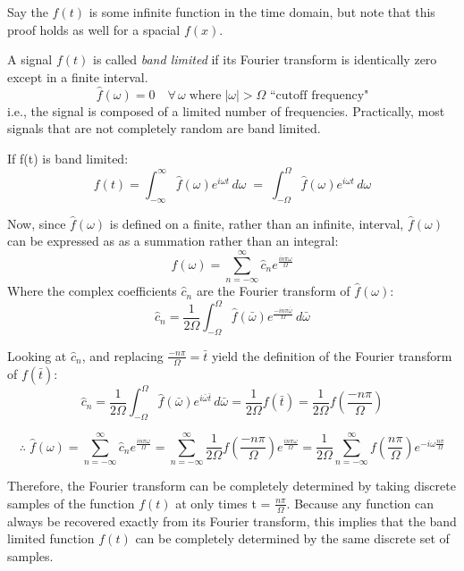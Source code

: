 \documentclass[12pt]{article}
\newcommand{\inftyint}{\int_{-\infty}^{\infty}}
\begin{document}
Say the \(f(t)\) is some infinite function in the time domain, but note that this proof holds as well for a spacial \(f(x)\).

A signal \(f(t)\) is called \emph{band limited} if its Fourier transform is identically zero except in a finite interval.
\[\hat{f}(\omega) = 0 \quad \forall \, \omega \; \text{where} \; |\omega| > \Omega \text{ ``cutoff frequency"}\]
i.e., the signal is composed of a limited number of frequencies. Practically, most signals that are not completely random are band limited.

If f(t) is band limited:
\begin{equation}
\label{eq:nft}
f(t) = \inftyint \hat{f}(\omega)e^{i\omega t} \,d\omega \; = \; \int_{-\Omega}^{\Omega} \hat{f}(\omega)e^{i\omega t} \,d\omega
\end{equation}

Now, since \( \hat{f}(\omega) \) is defined on a finite, rather than an infinite, interval, \( \hat{f}(\omega) \) can be expressed as as a summation rather than an integral:
\[\hat{f}(\omega) = \sum_{n = -\infty}^{\infty} \hat{c}_{n}e^{\frac{i n \pi \omega}{\Omega}} \]
Where the complex coefficients \( \hat{c}_n\) are the Fourier transform of \( \hat{f}(\omega) \):
\[\hat{ c}_n = \frac{1}{2\Omega} \int_{-\Omega}^{\Omega} \hat{f}(\bar{\omega})e^{\frac{-i n \pi \bar{ \omega}}{\Omega}}\,d\bar{\omega}\]

Looking at \(\hat{c}_n\), and replacing \( \frac{-n\pi}{\Omega} = \bar{t}\) yield the definition of the Fourier transform of \( f(\bar{t})\):
\[ \hat{c}_n = \frac{1}{2\Omega} \int_{-\Omega}^{\Omega} \hat{f}(\bar{\omega})e^{i\bar{\omega}\bar{t}}\,d\bar{\omega} = \frac{1}{2\Omega} f(\bar{t}) = \frac{1}{2\Omega} f(\frac{-n\pi}{\Omega})\]

\begin{equation}
\label{eq:nfhat}
\therefore \; \hat{f}(\omega) = \sum_{n = -\infty}^{\infty} \hat{c}_{n}e^{\frac{i n \pi \omega}{\Omega}} = \sum_{n = -\infty}^{\infty} \frac{1}{2\Omega} f(\frac{-n\pi}{\Omega})e^{\frac{i n \pi \omega}{\Omega}} = \frac{1}{2\Omega} \sum_{n = -\infty}^{\infty} f(\frac{n\pi}{\Omega})e^{-i \omega \frac{n \pi}{\Omega} } 
\end{equation}

Therefore, the Fourier transform can be completely determined by taking discrete samples of the function \( f(t) \) at only times t = \( \frac{n\pi}{\Omega}\). Because any function can always be recovered exactly from its Fourier transform, this implies that the band limited function \( f(t) \) can be completely determined by the same discrete set of samples.
\end{document}
